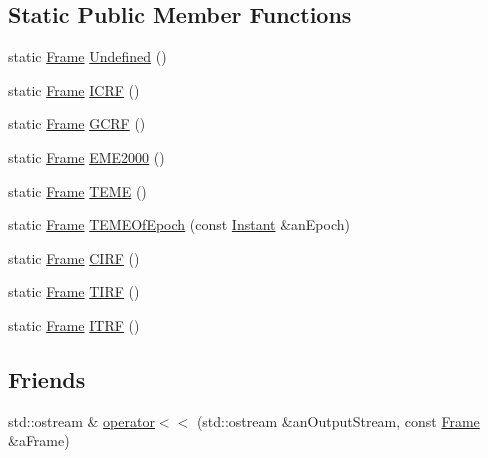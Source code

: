 \subsection*{Static Public Member Functions}
\begin{DoxyCompactItemize}
\item 
static \hyperlink{classlibrary_1_1physics_1_1coord_1_1_frame}{Frame} \hyperlink{classlibrary_1_1physics_1_1coord_1_1_frame_a60d6629cb3ae2e58137dfe912ab8294c}{Undefined} ()
\item 
static \hyperlink{classlibrary_1_1physics_1_1coord_1_1_frame}{Frame} \hyperlink{classlibrary_1_1physics_1_1coord_1_1_frame_a8abd7a55ac68180fa2df1bdf8869ef42}{I\+C\+RF} ()
\item 
static \hyperlink{classlibrary_1_1physics_1_1coord_1_1_frame}{Frame} \hyperlink{classlibrary_1_1physics_1_1coord_1_1_frame_a13d27e609f1dc1b2eed4bfe3d48559a4}{G\+C\+RF} ()
\item 
static \hyperlink{classlibrary_1_1physics_1_1coord_1_1_frame}{Frame} \hyperlink{classlibrary_1_1physics_1_1coord_1_1_frame_a9844ee4c21409aeb5105532c9dd3d89c}{E\+M\+E2000} ()
\item 
static \hyperlink{classlibrary_1_1physics_1_1coord_1_1_frame}{Frame} \hyperlink{classlibrary_1_1physics_1_1coord_1_1_frame_a187b1f1c49486503ad6860f7f1f2d257}{T\+E\+ME} ()
\item 
static \hyperlink{classlibrary_1_1physics_1_1coord_1_1_frame}{Frame} \hyperlink{classlibrary_1_1physics_1_1coord_1_1_frame_a467ed2b006004b1462cb168aeaf100e3}{T\+E\+M\+E\+Of\+Epoch} (const \hyperlink{classlibrary_1_1physics_1_1time_1_1_instant}{Instant} \&an\+Epoch)
\item 
static \hyperlink{classlibrary_1_1physics_1_1coord_1_1_frame}{Frame} \hyperlink{classlibrary_1_1physics_1_1coord_1_1_frame_aa9611712aad853baaf3c197a27f5d496}{C\+I\+RF} ()
\item 
static \hyperlink{classlibrary_1_1physics_1_1coord_1_1_frame}{Frame} \hyperlink{classlibrary_1_1physics_1_1coord_1_1_frame_a804d443561933b478a4116dda2d30287}{T\+I\+RF} ()
\item 
static \hyperlink{classlibrary_1_1physics_1_1coord_1_1_frame}{Frame} \hyperlink{classlibrary_1_1physics_1_1coord_1_1_frame_ac6ce00926b0c28bb2cca01882a67dfa0}{I\+T\+RF} ()
\end{DoxyCompactItemize}
\subsection*{Friends}
\begin{DoxyCompactItemize}
\item 
std\+::ostream \& \hyperlink{classlibrary_1_1physics_1_1coord_1_1_frame_a509ac1926cfc3553748bace204e2b1cc}{operator$<$$<$} (std\+::ostream \&an\+Output\+Stream, const \hyperlink{classlibrary_1_1physics_1_1coord_1_1_frame}{Frame} \&a\+Frame)
\end{DoxyCompactItemize}


